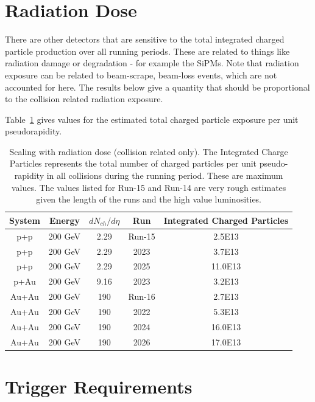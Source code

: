 \section{Radiation Dose}

There are other detectors that are sensitive to the total integrated charged particle production over all running periods.   These are related to things like radiation damage or degradation - for example the SiPMs.   Note that radiation exposure can be related to beam-scrape, beam-loss events, which are not accounted for here.   The results below give a quantity that should be proportional to the collision related radiation exposure.

Table~\ref{tab:radiation} gives values for the estimated total charged particle exposure per unit pseudorapidity.

\begin{table}[h]
\centering
\caption{Scaling with radiation dose (collision related only).  The Integrated Charge Particles represents the total number of charged particles per unit pseudo-rapidity in all collisions during the running period.  These are maximum values.  The values listed for Run-15 \pp and Run-14 \auau are very rough estimates given the length of the runs and the high value luminosities.\label{tab:radiation}}
\bigskip
\begin{tabular}{|c | c | c | c| c|}
\hline
System & Energy & $dN_{ch}/d\eta$ & Run & Integrated Charged Particles \\ \hline \hline
p+p & 200 GeV & 2.29 & Run-15 & 2.5E13 \\ \hline
p+p & 200 GeV & 2.29 & 2023 & 3.7E13 \\ \hline
p+p & 200 GeV & 2.29 & 2025 & 11.0E13 \\ \hline \hline
p+Au & 200 GeV & 9.16 & 2023 & 3.2E13 \\ \hline \hline
Au+Au & 200 GeV & 190 & Run-16 & 2.7E13 \\ \hline
Au+Au & 200 GeV & 190 & 2022 & 5.3E13 \\ \hline
Au+Au & 200 GeV & 190 & 2024 & 16.0E13 \\ \hline
Au+Au & 200 GeV & 190 & 2026 & 17.0E13 \\ \hline \hline
\end{tabular}
\end{table}

\section{Trigger Requirements}


